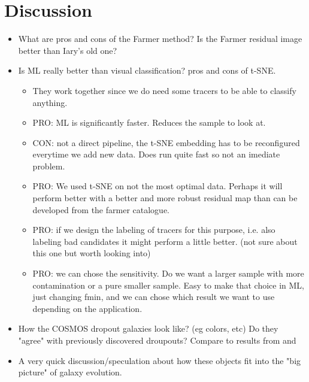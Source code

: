 \section{Discussion}
\begin{itemize}
    \item What are pros and cons of the Farmer method? Is the Farmer residual image better than Iary's old one?
    \item Is ML really better than visual classification? pros and cons of t-SNE.
    \begin{itemize}
        \item They work together since we do need some tracers to be able to classify anything.
        \item PRO: ML is significantly faster. Reduces the sample to look at.
        \item CON: not a direct pipeline, the t-SNE embedding has to be reconfigured everytime we add new data. Does run quite fast so not an imediate problem.
        \item PRO: We used t-SNE on not the most optimal data. Perhaps it will perform better with a better and more robust residual map than can be developed from the farmer catalogue.
        \item PRO: if we design the labeling of tracers for this purpose, i.e. also labeling bad candidates it might perform a little better. (not sure about this one but worth looking into)
        \item PRO: we can chose the sensitivity. Do we want a larger sample with more contamination or a pure smaller sample. Easy to make that choice in ML, just changing fmin, and we can chose which result we want to use depending on the application.
    \end{itemize}
    \item How the COSMOS dropout galaxies look like? (eg colors, etc) Do they "agree" with previously discovered droupouts? Compare to results from \cite{Wang_2019} and \cite{Alcalde_Pampliega_2019}
    \item A very quick discussion/speculation about how these objects fit into the "big picture" of galaxy evolution.
\end{itemize}


